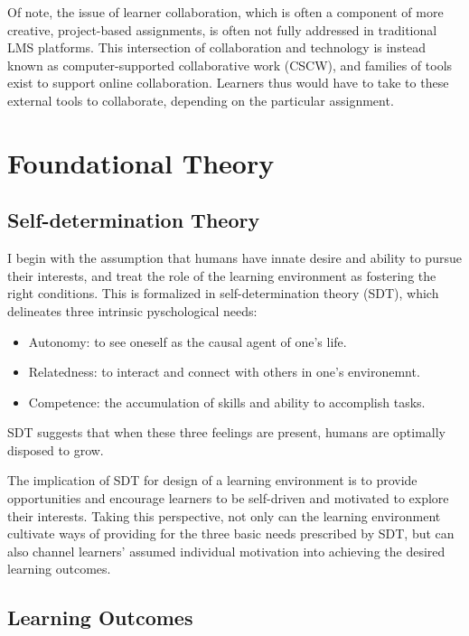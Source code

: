 \documentclass[12pt,twoside,vi]{mitthesis}
\begin{document}
Of note, the issue of learner collaboration, which is often a component of more creative, project-based assignments, is often not fully addressed in traditional LMS platforms. This intersection of collaboration and technology is instead known as computer-supported collaborative work (CSCW), and families of tools exist to support online collaboration. Learners thus would have to take to these external tools to collaborate, depending on the particular assignment.

\section{Foundational Theory}

\subsection{Self-determination Theory}

I begin with the assumption that humans have innate desire and ability to pursue their interests, and treat the role of the learning environment as fostering the right conditions. This is formalized in self-determination theory (SDT), which delineates three intrinsic pyschological needs:
\begin{itemize}
\item Autonomy: to see oneself as the causal agent of one's life.
\item Relatedness: to interact and connect with others in one's environemnt.
\item Competence: the accumulation of skills and ability to accomplish tasks.
\end{itemize}
SDT suggests that when these three feelings are present, humans are optimally disposed to grow.~\cite{ryan2000self}\cite{selfdetermination2}

The implication of SDT for design of a learning environment is to provide opportunities and encourage learners to be self-driven and motivated to explore their interests. Taking this perspective, not only can the learning environment cultivate ways of providing for the three basic needs prescribed by SDT, but can also channel learners' assumed individual motivation into achieving the desired learning outcomes.~\cite{selfdetermination}\cite{niemiec2009autonomy}

\subsection{Learning Outcomes}
\end{document}
